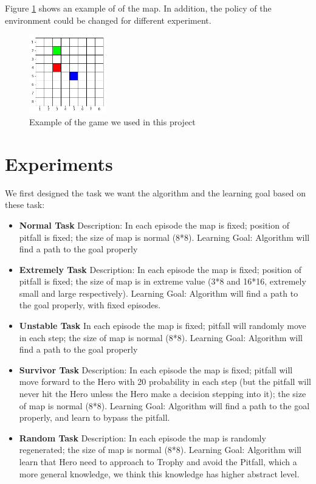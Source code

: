 \documentclass[article]{aaltoseries}
\begin{document}
 Figure \ref{fig:map} shows an example of of the map. In addition, the policy of the environment could be changed for different experiment.

\begin{figure}[t!]
  \begin{center}
    \includegraphics[width=0.3\textwidth]{figures/grid_drew}
    \caption{Example of the game we used in this project}
    \label{fig:map}
  \end{center}
\end{figure}



\section{Experiments}

We first designed the task we want the algorithm and the learning goal based on these task: 
\begin{itemize}
\item \textbf{Normal Task}
Description: In each episode the map is fixed; position of pitfall is fixed; the size of map is normal (8*8).
Learning Goal:  Algorithm will find a path to the goal properly

\item \textbf{Extremely Task}
Description: In each episode the map is fixed; position of pitfall is fixed; the size of map is in extreme value (3*8 and 16*16, extremely small and large respectively).
Learning Goal: Algorithm will find a path to the goal properly, with fixed episodes.

\item \textbf{Unstable Task}
In each episode the map is fixed; pitfall will randomly move in each step; the size of map is normal (8*8).
Learning Goal:  Algorithm will find a path to the goal properly

\item \textbf{Survivor Task}
Description: In each episode the map is fixed; pitfall will move forward to the Hero with 20\text{\%} probability in each step (but the pitfall will never hit the Hero unless the Hero make a decision stepping into it); the size of map is normal (8*8).
Learning Goal:  Algorithm will find a path to the goal properly, and learn to bypass the pitfall.

\item \textbf{Random Task}
Description: In each episode the map is randomly regenerated; the size of map is normal (8*8).
Learning Goal: Algorithm will learn that Hero need to approach to Trophy and avoid the Pitfall, which a more general knowledge, we think this knowledge has higher abstract level. 
\end{itemize}
\end{document}
